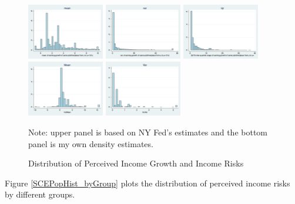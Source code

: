 \documentclass[]{article}
\begin{document}
\begin{figure}[ht]
	
	\centering
	\caption{Distribution of Perceived Income Growth and Income Risks}
	\label{SCEPopHist}
	\includegraphics[width=0.3\textwidth]{figures/hist_mean.png}
	\includegraphics[width=0.3\textwidth]{figures/hist_var.png}
	\includegraphics[width=0.3\textwidth]{figures/hist_iqr.png} \\
		\includegraphics[width=0.3\textwidth]{figures/hist_IncMean.png}
	\includegraphics[width=0.3\textwidth]{figures/hist_IncVar.png}
	\begin{flushleft}
		{\footnotesize Note: upper panel is based on NY Fed's estimates and the bottom panel is my own density estimates. }
	\end{flushleft}
	
\end{figure}

Figure \ref{SCEPopHist_byGroup} plots the distribution of perceived income risks by different groups. 
\end{document}
